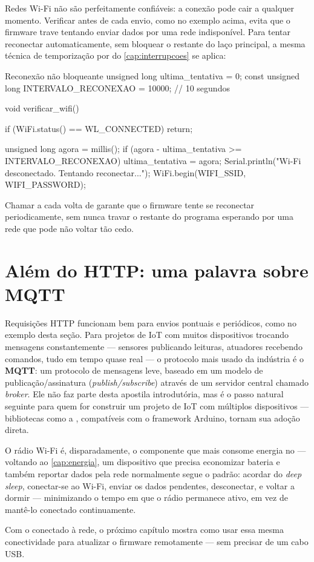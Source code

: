 Redes Wi-Fi não são perfeitamente confiáveis: a conexão pode cair a qualquer momento. Verificar  antes de cada envio, como no exemplo acima, evita que o firmware trave tentando enviar dados por uma rede indisponível. Para tentar reconectar automaticamente, sem bloquear o restante do laço principal, a mesma técnica de temporização por  do \cref{cap:interrupcoes} se aplica:

\begin{codigoc}{Reconexão não bloqueante}
unsigned long ultima_tentativa = 0;
const unsigned long INTERVALO_RECONEXAO = 10000;   // 10 segundos

void verificar_wifi() {
    if (WiFi.status() == WL_CONNECTED) {
        return;
    }

    unsigned long agora = millis();
    if (agora - ultima_tentativa >= INTERVALO_RECONEXAO) {
        ultima_tentativa = agora;
        Serial.println("Wi-Fi desconectado. Tentando reconectar...");
        WiFi.begin(WIFI_SSID, WIFI_PASSWORD);
    }
}
\end{codigoc}

Chamar  a cada volta de  garante que o firmware tente se reconectar periodicamente, sem nunca travar o restante do programa esperando por uma rede que pode não voltar tão cedo.

\section{Além do HTTP: uma palavra sobre MQTT}

Requisições HTTP funcionam bem para envios pontuais e periódicos, como no exemplo desta seção. Para projetos de IoT com muitos dispositivos trocando mensagens constantemente — sensores publicando leituras, atuadores recebendo comandos, tudo em tempo quase real — o protocolo mais usado da indústria é o \textbf{MQTT}: um protocolo de mensagens leve, baseado em um modelo de publicação/assinatura (\emph{publish/subscribe}) através de um servidor central chamado \emph{broker}. Ele não faz parte desta apostila introdutória, mas é o passo natural seguinte para quem for construir um projeto de IoT com múltiplos dispositivos — bibliotecas como a , compatíveis com o framework Arduino, tornam sua adoção direta.

\begin{esp32box}
O rádio Wi-Fi é, disparadamente, o componente que mais consome energia no \ESP{} — voltando ao \cref{cap:energia}, um dispositivo que precisa economizar bateria e também reportar dados pela rede normalmente segue o padrão: acordar do \emph{deep sleep}, conectar-se ao Wi-Fi, enviar os dados pendentes, desconectar, e voltar a dormir — minimizando o tempo em que o rádio permanece ativo, em vez de mantê-lo conectado continuamente.
\end{esp32box}

Com o \ESP{} conectado à rede, o próximo capítulo mostra como usar essa mesma conectividade para atualizar o firmware remotamente — sem precisar de um cabo USB.
